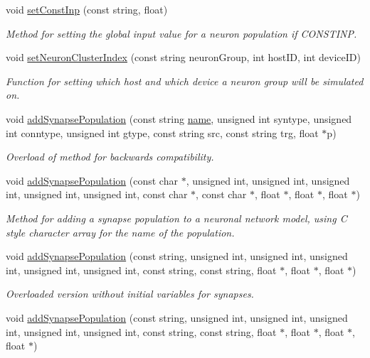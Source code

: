 \begin{DoxyCompactItemize}
void \hyperlink{classNNmodel_a9630c120beba41655f1f23e6dd21242e}{set\+Const\+Inp} (const string, float)
\begin{DoxyCompactList}\small\item\em Method for setting the global input value for a neuron population if C\+O\+N\+S\+T\+I\+N\+P. \end{DoxyCompactList}\item 
void \hyperlink{classNNmodel_a65aee794c66069cd3e6316ade0c91192}{set\+Neuron\+Cluster\+Index} (const string neuron\+Group, int host\+I\+D, int device\+I\+D)
\begin{DoxyCompactList}\small\item\em Function for setting which host and which device a neuron group will be simulated on. \end{DoxyCompactList}\item 
void \hyperlink{classNNmodel_a9dceb36a7d36c82adfdb5642df8f25f7}{add\+Synapse\+Population} (const string \hyperlink{classNNmodel_a7d81556b7b15a4a625b23f965944dae9}{name}, unsigned int syntype, unsigned int conntype, unsigned int gtype, const string src, const string trg, float $\ast$p)
\begin{DoxyCompactList}\small\item\em Overload of method for backwards compatibility. \end{DoxyCompactList}\item 
void \hyperlink{classNNmodel_ac82f4463de85aa6e345bc52518eb1f75}{add\+Synapse\+Population} (const char $\ast$, unsigned int, unsigned int, unsigned int, unsigned int, unsigned int, const char $\ast$, const char $\ast$, float $\ast$, float $\ast$, float $\ast$)
\begin{DoxyCompactList}\small\item\em Method for adding a synapse population to a neuronal network model, using C style character array for the name of the population. \end{DoxyCompactList}\item 
void \hyperlink{classNNmodel_aa31885e04282660f34e452c1310ef20e}{add\+Synapse\+Population} (const string, unsigned int, unsigned int, unsigned int, unsigned int, unsigned int, const string, const string, float $\ast$, float $\ast$, float $\ast$)
\begin{DoxyCompactList}\small\item\em Overloaded version without initial variables for synapses. \end{DoxyCompactList}\item 
void \hyperlink{classNNmodel_ac84ccb2f8e4dc3e3343fb663adedc460}{add\+Synapse\+Population} (const string, unsigned int, unsigned int, unsigned int, unsigned int, unsigned int, const string, const string, float $\ast$, float $\ast$, float $\ast$, float $\ast$)

\end{DoxyCompactItemize}
